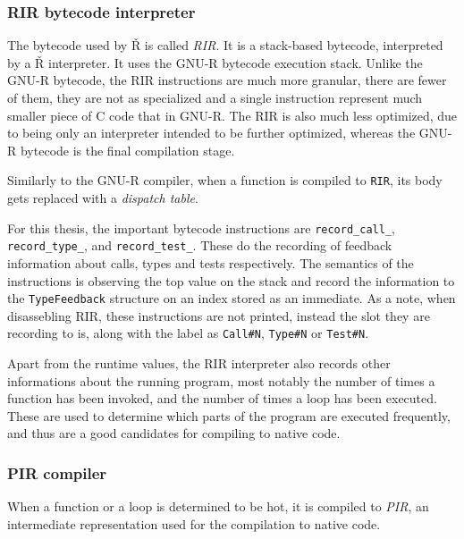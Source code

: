 \subsubsection{RIR bytecode interpreter}

The bytecode used by Ř is called \textit{RIR}. It is a stack-based bytecode, interpreted by a Ř interpreter. It uses the GNU-R bytecode execution stack. Unlike the GNU-R bytecode, the RIR instructions are much more granular, there are fewer of them, they are not as specialized and a single instruction represent much smaller piece of C code that in GNU-R. The RIR is also much less optimized, due to being only an interpreter intended to be further optimized, whereas the GNU-R bytecode is the final compilation stage.

Similarly to the GNU-R compiler, when a function is compiled to \texttt{RIR}, its body gets replaced with a \textit{dispatch table}.


For this thesis, the important bytecode instructions are \texttt{record\_call\_}, \texttt{record\_type\_}, and \texttt{record\_test\_}. These do the recording of feedback information about calls, types and tests respectively. The semantics of the instructions is observing the top value on the stack and record the information to the \texttt{TypeFeedback} structure on an index stored as an immediate. As a note, when disassebling RIR, these instructions are not printed, instead the slot they are recording to is, along with the label as \texttt{Call\#N}, \texttt{Type\#N} or \texttt{Test\#N}.

Apart from the runtime values, the RIR interpreter also records other informations about the running program, most notably the number of times a function has been invoked, and the number of times a loop has been executed. These are used to determine which parts of the program are executed frequently, and thus are a good candidates for compiling to native code.

\subsubsection{PIR compiler}
When a function or a loop is determined to be hot, it is compiled to \textit{PIR}, an intermediate representation used for the compilation to native code.


